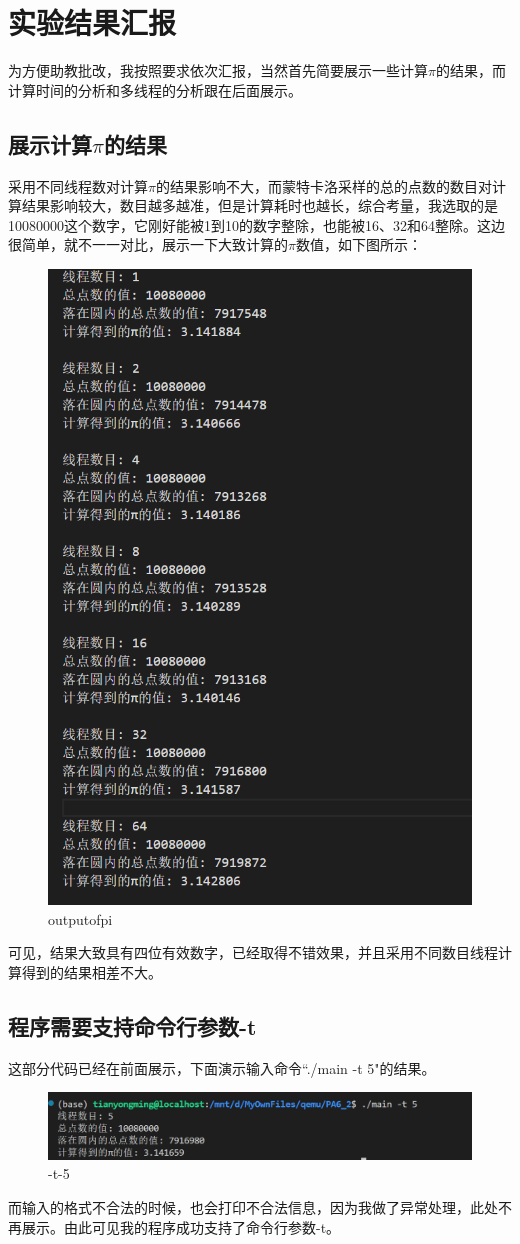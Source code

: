 \documentclass{LabReport}
\begin{document}
	\section{实验结果汇报}
	为方便助教批改，我按照要求依次汇报，当然首先简要展示一些计算$\pi$的结果，而计算时间的分析和多线程的分析跟在后面展示。
	\subsection{展示计算$\pi$的结果}
	采用不同线程数对计算$\pi$的结果影响不大，而蒙特卡洛采样的总的点数的数目对计算结果影响较大，数目越多越准，但是计算耗时也越长，综合考量，我选取的是10080000这个数字，它刚好能被1到10的数字整除，也能被16、32和64整除。这边很简单，就不一一对比，展示一下大致计算的$\pi$数值，如下图所示：
	
\begin{figure}[h!]
	\centering
	\includegraphics[width=0.5\linewidth]{figures/output_of_pi}
	\caption{outputofpi}
	\label{fig:outputofpi}
\end{figure}

	可见，结果大致具有四位有效数字，已经取得不错效果，并且采用不同数目线程计算得到的结果相差不大。
	
	\subsection{程序需要支持命令行参数-t}
	这部分代码已经在前面展示，下面演示输入命令``./main -t 5"的结果。
	
\begin{figure}[h!]
	\centering
	\includegraphics[width=0.7\linewidth]{"figures/-t 5"}
	\caption{-t-5}
	\label{fig:-t-5}
\end{figure}
	而输入的格式不合法的时候，也会打印不合法信息，因为我做了异常处理，此处不再展示。由此可见我的程序成功支持了命令行参数-t。
	
\end{document}
